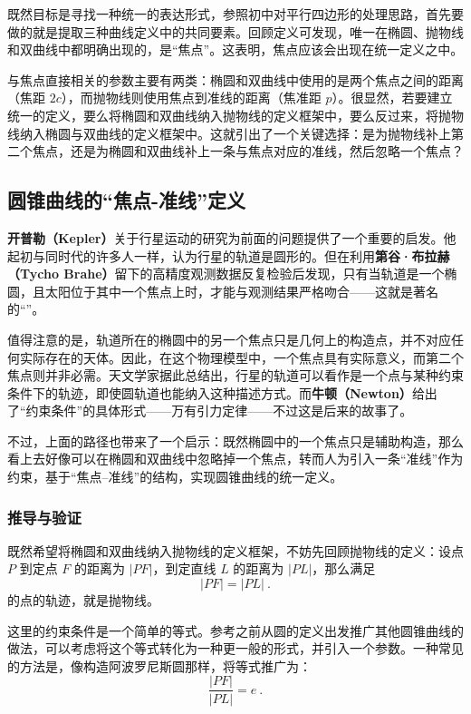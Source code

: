 既然目标是寻找一种统一的表达形式，参照初中对平行四边形的处理思路，首先要做的就是提取三种曲线定义中的共同要素。回顾定义可发现，唯一在椭圆、抛物线和双曲线中都明确出现的，是“焦点”。这表明，焦点应该会出现在统一定义之中。

与焦点直接相关的参数主要有两类：椭圆和双曲线中使用的是两个焦点之间的距离（焦距 $2c$），而抛物线则使用焦点到准线的距离（焦准距 $p$）。很显然，若要建立统一的定义，要么将椭圆和双曲线纳入抛物线的定义框架中，要么反过来，将抛物线纳入椭圆与双曲线的定义框架中。这就引出了一个关键选择：是为抛物线补上第二个焦点，还是为椭圆和双曲线补上一条与焦点对应的准线，然后忽略一个焦点？

\subsection{圆锥曲线的“焦点-准线”定义}

\textbf{开普勒（Kepler）}关于行星运动的研究为前面的问题提供了一个重要的启发。他起初与同时代的许多人一样，认为行星的轨道是圆形的。但在利用\textbf{第谷·布拉赫（Tycho Brahe）}留下的高精度观测数据反复检验后发现，只有当轨道是一个椭圆，且太阳位于其中一个焦点上时，才能与观测结果严格吻合——这就是著名的“”。

值得注意的是，轨道所在的椭圆中的另一个焦点只是几何上的构造点，并不对应任何实际存在的天体。因此，在这个物理模型中，一个焦点具有实际意义，而第二个焦点则并非必需。天文学家据此总结出，行星的轨道可以看作是一个点与某种约束条件下的轨迹，即使圆轨道也能纳入这种描述方式。而\textbf{牛顿（Newton）}给出了“约束条件”的具体形式——万有引力定律——不过这是后来的故事了。

不过，上面的路径也带来了一个启示：既然椭圆中的一个焦点只是辅助构造，那么看上去好像可以在椭圆和双曲线中忽略掉一个焦点，转而人为引入一条“准线”作为约束，基于“焦点–准线”的结构，实现圆锥曲线的统一定义。

\subsubsection{推导与验证}

既然希望将椭圆和双曲线纳入抛物线的定义框架，不妨先回顾抛物线的定义：设点 $P$ 到定点 $F$ 的距离为 $|PF|$，到定直线 $L$ 的距离为 $|PL|$，那么满足
\begin{equation}
|PF| = |PL|~.
\end{equation}
的点的轨迹，就是抛物线。

这里的约束条件是一个简单的等式。参考之前从圆的定义出发推广其他圆锥曲线的做法，可以考虑将这个等式转化为一种更一般的形式，并引入一个参数。一种常见的方法是，像构造阿波罗尼斯圆那样，将等式推广为：
$$
\frac{|PF|}{|PL|} = e~.
$$

